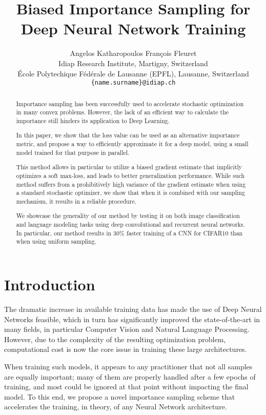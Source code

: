 \documentclass{article}
\title{Biased Importance Sampling for Deep Neural Network Training}
\author{
    Angelos Katharopoulos \quad Fran{\c{c}}ois Fleuret \\
    Idiap Research Institute, Martigny, Switzerland \\
    {\'E}cole Polytechique F{\'e}d{\'e}rale de Lausanne (EPFL), Lausanne, Switzerland \\
    \texttt{\{name.surname\}@idiap.ch}
}
\begin{document}
\maketitle

\begin{abstract}

Importance sampling has been successfully used to accelerate stochastic
optimization in many convex problems. However, the lack of an efficient way to
calculate the importance still hinders its application to Deep Learning.

In this paper, we show that the loss value can be used as an alternative
importance metric, and propose a way to efficiently approximate it for a deep
model, using a small model trained for that purpose in parallel.

This method allows in particular to utilize a biased gradient estimate that
implicitly optimizes a soft max-loss, and leads to better generalization
performance. While such method suffers from a prohibitively high variance of
the gradient estimate when using a standard stochastic optimizer, we show that
when it is combined with our sampling mechanism, it results in a reliable
procedure.

We showcase the generality of our method by testing it on both image
classification and language modeling tasks using deep convolutional and
recurrent neural networks. In particular, our method results in 30\% faster
training of a CNN for CIFAR10 than when using uniform sampling.

\end{abstract}

\section{Introduction}

The dramatic increase in available training data has made the use of Deep
Neural Networks feasible, which in turn has significantly improved the
state-of-the-art in many fields, in particular Computer Vision and Natural
Language Processing. However, due to the complexity of the resulting
optimization problem, computational cost is now the core issue in training
these large architectures.

When training such models, it appears to any practitioner that not all samples
are equally important; many of them are properly handled after a few epochs of
training, and most could be ignored at that point without impacting the final
model. To this end, we propose a novel importance sampling scheme that
accelerates the training, in theory, of any Neural Network architecture.
\end{document}
